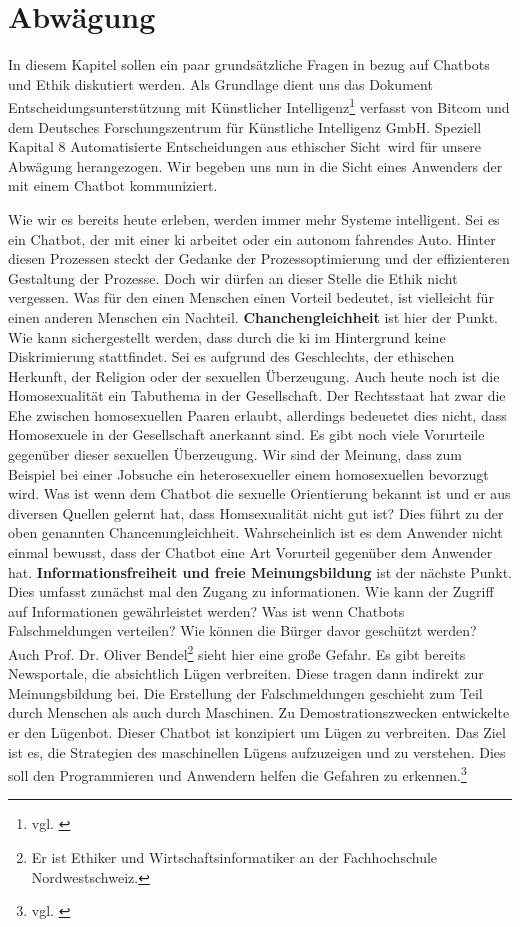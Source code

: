 \section{Abwägung}
In diesem Kapitel sollen ein paar grundsätzliche Fragen in bezug auf Chatbots und Ethik diskutiert werden. Als Grundlage dient uns das Dokument \glqq Entscheidungsunterstützung mit Künstlicher Intelligenz\grqq\footnote{vgl. \cite{Bitkom}} verfasst von Bitcom und dem Deutsches Forschungszentrum für Künstliche Intelligenz GmbH. Speziell Kapital 8 \glqq Automatisierte Entscheidungen aus ethischer Sicht\grqq\ wird für unsere Abwägung herangezogen. Wir begeben uns nun in die Sicht eines Anwenders der mit einem Chatbot kommuniziert. 

Wie wir es bereits heute erleben, werden immer mehr Systeme \glqq intelligent\grqq. Sei es ein Chatbot, der mit einer \ac{ki} arbeitet oder ein autonom fahrendes Auto. Hinter diesen Prozessen steckt der Gedanke der Prozessoptimierung und der effizienteren Gestaltung der Prozesse. Doch wir dürfen an dieser Stelle die Ethik nicht vergessen. Was für den einen Menschen einen Vorteil bedeutet, ist vielleicht für einen anderen Menschen ein Nachteil. \newline
\textbf{Chanchengleichheit} ist hier der Punkt. Wie kann sichergestellt werden, dass durch die \ac{ki} im Hintergrund keine Diskrimierung stattfindet. Sei es aufgrund des Geschlechts, der ethischen Herkunft, der Religion oder der sexuellen Überzeugung. Auch heute noch ist die Homosexualität ein Tabuthema in der Gesellschaft. Der Rechtsstaat hat zwar die Ehe zwischen homosexuellen Paaren erlaubt, allerdings bedeuetet dies nicht, dass Homosexuele in der Gesellschaft anerkannt sind. Es gibt noch viele Vorurteile gegenüber dieser sexuellen Überzeugung. Wir sind der Meinung, dass zum Beispiel bei einer Jobsuche ein heterosexueller einem homosexuellen bevorzugt wird. Was ist wenn dem Chatbot die sexuelle Orientierung bekannt ist und er aus diversen Quellen gelernt hat, dass Homsexualität nicht gut ist? Dies führt zu der oben genannten Chancenungleichheit. Wahrscheinlich ist es dem Anwender nicht einmal bewusst, dass der Chatbot eine Art Vorurteil gegenüber dem Anwender hat. \newline
\textbf{Informationsfreiheit und freie Meinungsbildung} ist der nächste Punkt. Dies umfasst zunächst mal den Zugang zu informationen. Wie kann der Zugriff auf Informationen gewährleistet werden? Was ist wenn Chatbots Falschmeldungen verteilen? Wie können die Bürger davor geschützt werden? \newline
Auch Prof. Dr. Oliver Bendel\footnote{Er ist Ethiker und Wirtschaftsinformatiker an der Fachhochschule Nordwestschweiz.} sieht hier eine große Gefahr. Es gibt bereits Newsportale, die absichtlich Lügen verbreiten. Diese tragen dann indirekt zur Meinungsbildung bei. Die Erstellung der Falschmeldungen geschieht zum Teil durch Menschen als auch durch Maschinen. Zu Demostrationszwecken entwickelte er den Lügenbot. Dieser Chatbot ist konzipiert um Lügen zu verbreiten. Das Ziel ist es, die Strategien des maschinellen Lügens aufzuzeigen und zu verstehen. Dies soll den Programmieren und Anwendern helfen die Gefahren zu erkennen.\footnote{vgl. \cite{Bendel}} 

